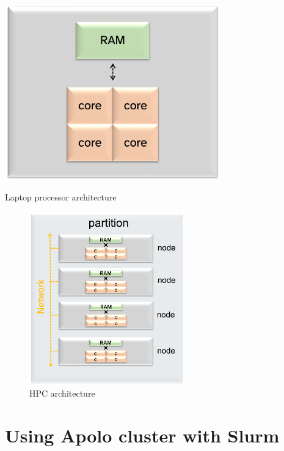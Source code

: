 \documentclass[
  letterpaper,
  DIV=11,
  numbers=noendperiod,
  oneside]{scrreprt}
\begin{document}
\begin{marginfigure}

{\centering \includegraphics[width=0.7\textwidth,height=\textheight]{chs-command-line/imgs-cli/laptop-arch.png}

}

\caption{Laptop processor architecture}

\end{marginfigure}

\begin{figure}

{\centering \includegraphics[width=0.6\textwidth,height=\textheight]{chs-command-line/imgs-cli/partition-arch.png}

}

\caption{HPC architecture}

\end{figure}

\hypertarget{using-apolo-cluster-with-slurm}{%
\section{Using Apolo cluster with
Slurm}\label{using-apolo-cluster-with-slurm}}
\end{document}
